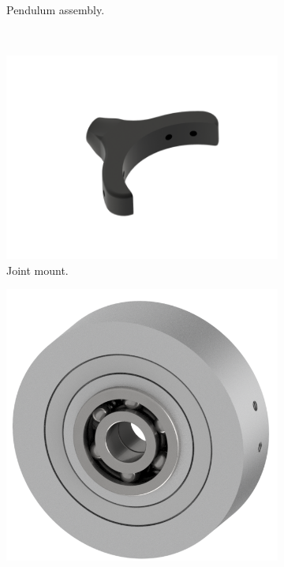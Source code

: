 \begin{figure}[H]
\begin{minipage}{.45\linewidth}
\begin{subfigure}[b]{\linewidth}
			\caption{Pendulum assembly.}
			\label{sfig:pendulumassembly}
		\end{subfigure}\\
		\begin{subfigure}[b]{\linewidth}
			\centering
			\includegraphics[width=\linewidth]{graphics/joint_mount}
			\caption{Joint mount.}
			\label{sfig:jointmount}
		\end{subfigure}	
	\end{minipage}
	\begin{minipage}{.4\linewidth}
		\begin{subfigure}[t]{\linewidth}
			\centering
			\includegraphics[width=\linewidth]{graphics/joint_mag_assembly}

\end{subfigure}
\end{minipage}
\end{figure}
